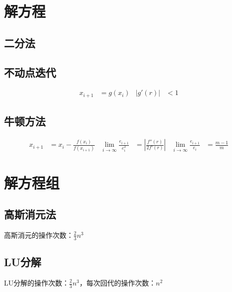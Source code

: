 \documentclass[twocolumn]{article}
\begin{document}
\section{解方程}

\subsection{二分法}
\begin{algorithm}
\end{algorithm}

\subsection{不动点迭代}
\begin{align*}
    x_{i+1} & =g(x_i) & |g'(r)| & <1
\end{align*}

\subsection{牛顿方法}
\begin{align*}
    x_{i+1} & =x_i-\frac{f(x_i)}{f(x_{i+1})} & \lim_{i\rightarrow \infty}\frac{e_{i+1}}{e_i^2} & =\left| \frac{f''(r)}{2f'(r)} \right| & \lim_{i\rightarrow \infty}\frac{e_{i+1}}{e_i} & =\frac{m-1}{m}
\end{align*}

\section{解方程组}

\subsection{高斯消元法}
高斯消元的操作次数：$\frac{2}{3}n^3$

\subsection{LU分解}
LU分解的操作次数：$\frac{2}{3}n^3$，每次回代的操作次数：$n^2$
\end{document}
